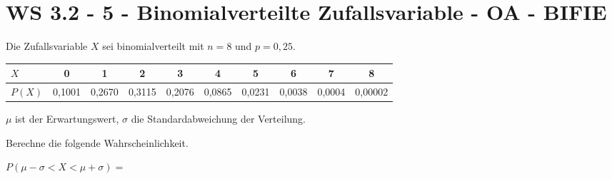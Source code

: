 \section{WS 3.2 - 5 - Binomialverteilte Zufallsvariable - OA - BIFIE}

\begin{beispiel}[WS 3.2]{1} %
Die Zufallsvariable $X$ sei binomialverteilt mit $n = 8$ und $p = 0,25$. \leer

\begin{tabular}{|l|c|c|c|c|c|c|c|c|c|} \hline
$X$ & 0&1&2&3&4&5&6&7&8 \\ \hline
$P(X)$&0,1001 &0,2670&0,3115&0,2076&0,0865&0,0231&0,0038&0,0004&0,00002 \\ \hline
\end{tabular} \leer


$\mu$ ist der Erwartungswert, $\sigma$ die Standardabweichung der Verteilung. \leer

Berechne die folgende Wahrscheinlichkeit.\leer

$P(\mu-\sigma < X < \mu + \sigma)=$


\end{beispiel} 